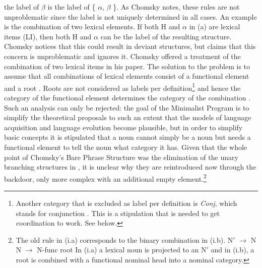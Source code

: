 the label of $\beta$ is the label of \{ $\alpha$, $\beta$ \}.
\zl
\largerpage
As Chomsky notes, these rules are not unproblematic since the label is not uniquely determined in all
cases. An example is the combination of two lexical elements. If both H and $\alpha$ in (a)
are lexical items (LI), then both H and $\alpha$ can be the label of the resulting
structure. Chomsky notices that this could result in deviant structures, but
claims that this concern is unproblematic and ignores it. 
Chomsky offered a treatment of the combination of two lexical items
in his \citeyear{Chomsky2013a} paper. The solution to the problem is to assume that all combinations of
lexical elements consist of a functional element and a root \citep{Marantz97a,Borer2005a-u}. Roots are not considered as labels per definition\footnote{%
  Another category that is excluded as label per definition is \emph{Conj}, which stands for
  conjunction \citep[--46]{Chomsky2013a}. This is a stipulation that is needed to get
  coordination to work. See below.
} and hence the category of the functional element
determines the category of the combination \citep[]{Chomsky2013a}. 
Such an analysis can only be rejected: the goal of the Minimalist Program is to simplify the
theoretical proposals to such an extent that the models of language acquisition and language evolution
become plausible, but in order to simplify basic concepts it is stipulated that a noun cannot simply
be a noun but needs a functional element to tell the noun what category it has. Given that the whole
point of Chomsky's Bare Phrase Structure \citep{Chomsky95b-u} was the elimination of the unary branching structures
in \xbart, it is unclear why they are reintroduced now through the backdoor, only more complex with
an additional empty element.\footnote{%
   The old \xbar rule in (i.a) corresponds to the binary combination in (i.b).
\eal
\ex N$'$ $\to$ N
\ex N $\to$ N-func root 
\zl
In (i.a) a lexical noun is projected to an N$'$ and in (i.b), a root is combined with a functional
nominal head into a nominal category.
}
